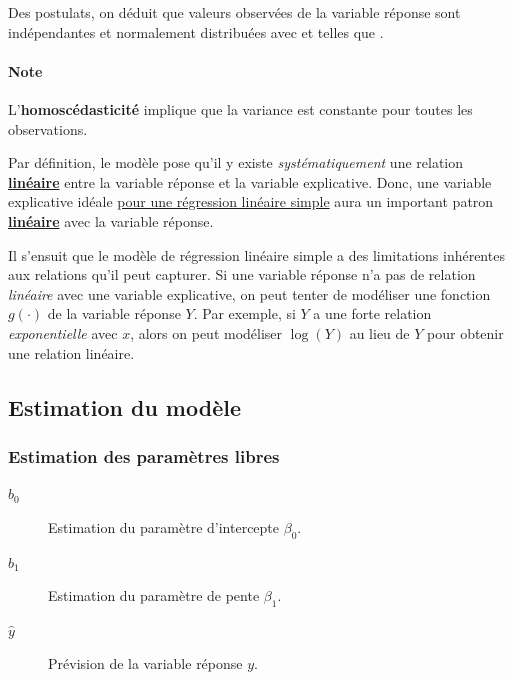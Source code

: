 \documentclass[french]{article}
\begin{document}
\begin{multicols*}{2}
\begin{definitionNOHFILLprop}
\bigskip

Des postulats, on déduit que valeurs observées de la variable réponse sont indépendantes et normalement distribuées avec  et  telles que .
\end{definitionNOHFILLprop}


\paragraph{Note}	L'\textbf{homoscédasticité} implique que la variance est constante pour toutes les observations.

\bigskip

\begin{rappel_enhanced}[Limitations]
Par définition, le modèle pose qu'il y existe \textit{systématiquement} une relation \textbf{\underline{linéaire}} entre la variable réponse et la variable explicative. Donc, une variable explicative idéale \underline{pour une régression linéaire simple} aura un important patron \textbf{\underline{linéaire}} avec la variable réponse.

\bigskip

Il s'ensuit que le modèle de régression linéaire simple a des limitations inhérentes aux relations qu'il peut capturer. Si une variable réponse n'a pas de relation \textit{linéaire} avec une variable explicative, on peut tenter de modéliser une fonction $g(\cdot)$ de la variable réponse $Y$. Par exemple, si $Y$ a une forte relation \textit{exponentielle} avec $x$, alors on peut modéliser $\log(Y)$ au lieu de $Y$ pour obtenir une relation linéaire.
\end{rappel_enhanced}



\columnbreak
\subsection{Estimation du modèle}
\subsubsection{Estimation des paramètres libres}
\begin{distributions}[Notation]
\begin{description}
	\item[$b_{0}$]	Estimation du paramètre d'intercepte $\beta_{0}$.
	\item[$b_{1}$]	Estimation du paramètre de pente $\beta_{1}$.
	\item[$\hat{y}$]	Prévision de la variable réponse $y$.
\end{description}
\end{distributions}


\end{multicols*}
\end{document}
